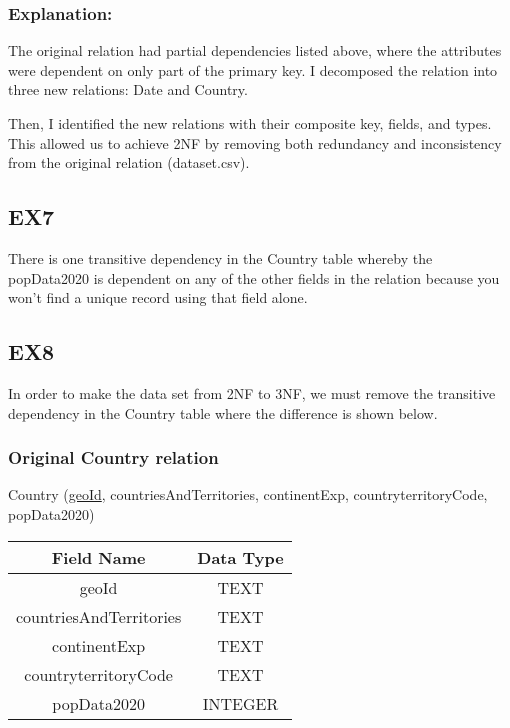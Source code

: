 \documentclass{article}
\begin{document}
\subsubsection{Explanation:}

The original relation had partial dependencies listed above, where the attributes were dependent on only part of the primary key. I decomposed the relation into three new relations: Date and Country.

Then, I identified the new relations with their composite key, fields, and types. This allowed us to achieve 2NF by removing both redundancy and inconsistency from the original relation (dataset.csv).

\subsection{EX7}

There is one transitive dependency in the Country table whereby the popData2020 is dependent on any of the other fields in the relation because you won't find a unique record using that field alone.

\subsection{EX8}

In order to make the data set from 2NF to 3NF, we must remove the transitive dependency in the Country table where the difference is shown below.

\subsubsection{Original Country relation}

Country (\underline{geoId}, countriesAndTerritories, continentExp, countryterritoryCode, popData2020)

\begin{center}
\begin{tabular}{ |c|c| }
\hline
\textbf{Field Name} & \textbf{Data Type} \\ \hline
geoId & TEXT \\ \hline
countriesAndTerritories & TEXT \\ \hline
continentExp & TEXT \\ \hline
countryterritoryCode & TEXT \\ \hline
popData2020 & INTEGER \\ \hline
\end{tabular}
\end{center}
\end{document}
